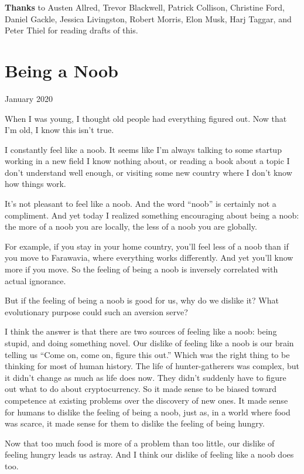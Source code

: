 \documentclass[12pt]{book}
\begin{document}
\textbf{Thanks} to Austen Allred, Trevor Blackwell, Patrick Collison,
Christine Ford, Daniel Gackle, Jessica Livingston, Robert Morris, Elon
Musk, Harj Taggar, and Peter Thiel for reading drafts of this.
\chapter{Being a Noob}

January 2020

When I was young, I thought old people had everything figured out. Now
that I'm old, I know this isn't true.

I constantly feel like a noob. It seems like I'm always talking to some
startup working in a new field I know nothing about, or reading a book
about a topic I don't understand well enough, or visiting some new
country where I don't know how things work.

It's not pleasant to feel like a noob. And the word ``noob'' is
certainly not a compliment. And yet today I realized something
encouraging about being a noob: the more of a noob you are locally, the
less of a noob you are globally.

For example, if you stay in your home country, you'll feel less of a
noob than if you move to Farawavia, where everything works differently.
And yet you'll know more if you move. So the feeling of being a noob is
inversely correlated with actual ignorance.

But if the feeling of being a noob is good for us, why do we dislike it?
What evolutionary purpose could such an aversion serve?

I think the answer is that there are two sources of feeling like a noob:
being stupid, and doing something novel. Our dislike of feeling like a
noob is our brain telling us ``Come on, come on, figure this out.''
Which was the right thing to be thinking for most of human history. The
life of hunter-gatherers was complex, but it didn't change as much as
life does now. They didn't suddenly have to figure out what to do about
cryptocurrency. So it made sense to be biased toward competence at
existing problems over the discovery of new ones. It made sense for
humans to dislike the feeling of being a noob, just as, in a world where
food was scarce, it made sense for them to dislike the feeling of being
hungry.

Now that too much food is more of a problem than too little, our dislike
of feeling hungry leads us astray. And I think our dislike of feeling
like a noob does too.
\end{document}
